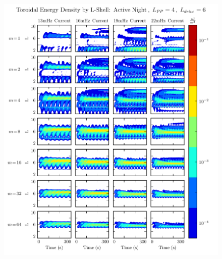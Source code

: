 \begin{figure}[!htb]
    \centering
    \includegraphics[width=\textwidth]{figures/layers_t_3_4_6.pdf}
    \caption[Radial Distribution of Toroidal Energy: Active Night]{
    }
    \label{fig_layers_t_3_4_6}
\end{figure}



